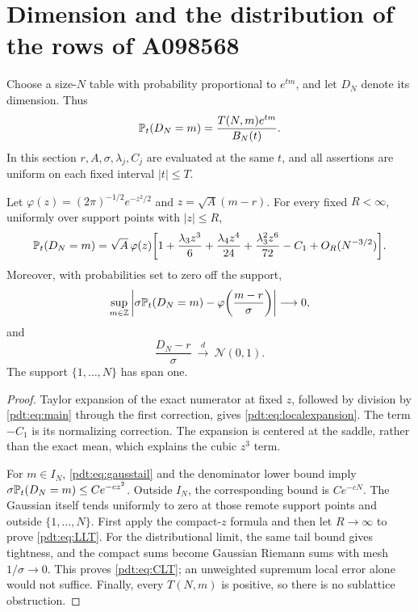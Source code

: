 \section{Dimension and the distribution of the rows of A098568}
\label{pdt:sec:dimension}
Choose a size-$N$ table with probability proportional to $e^{tm}$, and let $D_N$ denote its dimension. Thus
\[
 \mathbb P_t(D_N=m)=\frac{T(N,m)e^{tm}}{B_N(t)}.
\]
In this section $r,A,\sigma,\lambda_j,C_j$ are evaluated at the same $t$, and all assertions are uniform on each fixed interval $|t|\le T$.

\begin{theorem}\label{pdt:thm:dimension}
Let $\varphi(z)=(2\pi)^{-1/2}e^{-z^2/2}$ and $z=\sqrt A(m-r)$. For every fixed $R<\infty$, uniformly over support points with $|z|\le R$,
\begin{equation}\label{pdt:eq:localexpansion}
 \begin{split}
 \mathbb P_t(D_N=m)=\sqrt A\,\varphi(z)\bigg[
 1+\frac{\lambda_3z^3}6+\frac{\lambda_4z^4}{24}
 +\frac{\lambda_3^2z^6}{72}-C_1+O_R(N^{-3/2})\bigg].
 \end{split}
\end{equation}
Moreover, with probabilities set to zero off the support,
\begin{equation}\label{pdt:eq:LLT}
 \sup_{m\in\mathbb Z}\left|\sigma\mathbb P_t(D_N=m)
                    -\varphi\!\left(\frac{m-r}{\sigma}\right)\right|\longrightarrow0,
\end{equation}
and
\begin{equation}\label{pdt:eq:CLT}
 \frac{D_N-r}{\sigma}\ \xrightarrow{\ d\ }\ \mathcal N(0,1).
\end{equation}
The support $\{1,\ldots,N\}$ has span one.
\end{theorem}
\begin{proof}
Taylor expansion of the exact numerator at fixed $z$, followed by division by \eqref{pdt:eq:main} through the first correction, gives \eqref{pdt:eq:localexpansion}. The term $-C_1$ is its normalizing correction. The expansion is centered at the saddle, rather than the exact mean, which explains the cubic $z^3$ term.

For $m\in I_N$, \eqref{pdt:eq:gausstail} and the denominator lower bound imply
$\sigma\mathbb P_t(D_N=m)\le C e^{-cz^2}$. Outside $I_N$, the corresponding bound is $Ce^{-cN}$. The Gaussian itself tends uniformly to zero at those remote support points and outside $\{1,\ldots,N\}$. First apply the compact-$z$ formula and then let $R\to\infty$ to prove \eqref{pdt:eq:LLT}. For the distributional limit, the same tail bound gives tightness, and the compact sums become Gaussian Riemann sums with mesh $1/\sigma\to0$. This proves \eqref{pdt:eq:CLT}; an unweighted supremum local error alone would not suffice. Finally, every $T(N,m)$ is positive, so there is no sublattice obstruction.
\end{proof}


